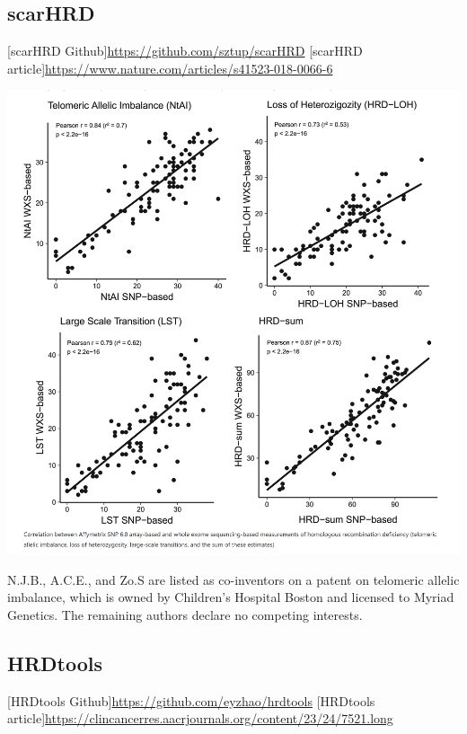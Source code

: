 \documentclass[
]{article}
\begin{document}
\pagebreak

\hypertarget{scarhrd}{%
\subsection{scarHRD}\label{scarhrd}}

{[}scarHRD Github{]}\url{https://github.com/sztup/scarHRD} {[}scarHRD
article{]}\url{https://www.nature.com/articles/s41523-018-0066-6}

\includegraphics{img/scarHRD.png}

N.J.B., A.C.E., and Zo.S are listed as co-inventors on a patent on
telomeric allelic imbalance, which is owned by Children's Hospital
Boston and licensed to Myriad Genetics. The remaining authors declare no
competing interests.

\pagebreak

\hypertarget{hrdtools}{%
\subsection{HRDtools}\label{hrdtools}}

{[}HRDtools Github{]}\url{https://github.com/eyzhao/hrdtools}
{[}HRDtools
article{]}\url{https://clincancerres.aacrjournals.org/content/23/24/7521.long}
\end{document}
